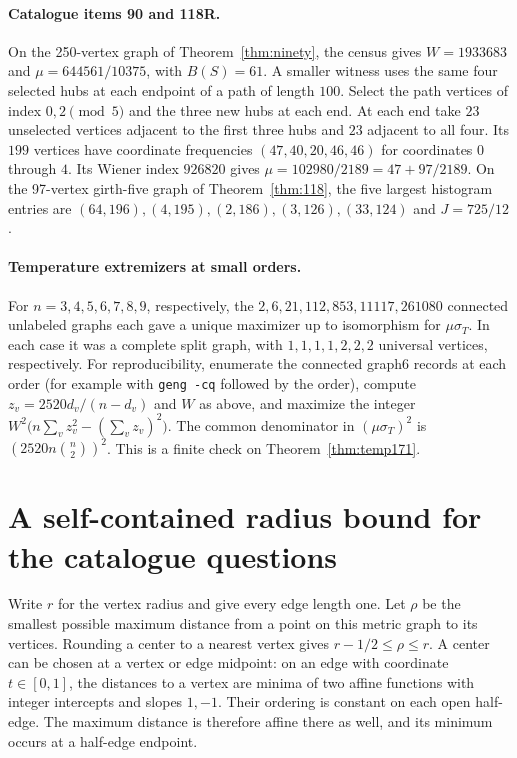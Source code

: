 \documentclass[11pt,a4paper]{article}
\theoremstyle{remark}\newtheorem*{remark}{Remark}
\begin{document}
\paragraph{Catalogue items 90 and 118R.} On the 250-vertex graph of Theorem~\ref{thm:ninety}, the census gives $W=1933683$ and $\mu=644561/10375$, with $B(S)=61$. A smaller witness uses the same four selected hubs at each endpoint of a path of length $100$. Select the path vertices of index $0,2\pmod 5$ and the three new hubs at each end. At each end take $23$ unselected vertices adjacent to the first three hubs and $23$ adjacent to all four. Its $199$ vertices have coordinate frequencies $(47,40,20,46,46)$ for coordinates $0$ through $4$. Its Wiener index $926820$ gives $\mu=102980/2189=47+97/2189$. On the 97-vertex girth-five graph of Theorem~\ref{thm:118}, the five largest histogram entries are $(64,196),(4,195),(2,186),(3,126),(33,124)$ and $J=725/12$.

\paragraph{Temperature extremizers at small orders.} For $n=3,4,5,6,7,8,9$, respectively, the $2,6,21,112,853,11117,261080$ connected unlabeled graphs each gave a unique maximizer up to isomorphism for $\mu\sigma_T$. In each case it was a complete split graph, with $1,1,1,1,2,2,2$ universal vertices, respectively. For reproducibility, enumerate the connected graph6 records at each order (for example with \texttt{geng -cq} followed by the order), compute $z_v=2520d_v/(n-d_v)$ and $W$ as above, and maximize the integer $W^2\bigl(n\sum_v z_v^2-(\sum_v z_v)^2\bigr)$. The common denominator in $(\mu\sigma_T)^2$ is $(2520n\binom n2)^2$. This is a finite check on Theorem~\ref{thm:temp171}.


\appendix
\section{A self-contained radius bound for the catalogue questions}
\label{sec:radius-certified}
Write $r$ for the vertex radius and give every edge length one. Let $\rho$
be the smallest possible maximum distance from a point on this metric
graph to its vertices. Rounding a center to a nearest vertex gives
$r-1/2\le\rho\le r$. A center can be chosen at a vertex or edge midpoint:
on an edge with coordinate $t\in[0,1]$, the distances to a vertex
are minima of two affine functions with integer intercepts and slopes
$1,-1$. Their ordering is constant on each open half-edge. The maximum
distance is therefore affine there as well, and its minimum occurs at a
half-edge endpoint.
\end{document}
